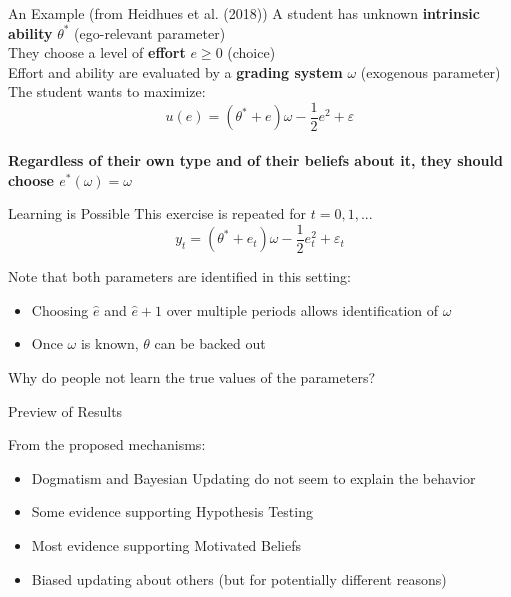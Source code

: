 \documentclass[aspectratio=169]{beamer}
\begin{document}
\begin{frame}{An Example (from Heidhues et al. (2018))}
    A student has unknown \textbf{intrinsic ability} $\theta^*$ (\alert{ego-relevant parameter})\\ 
    \bigskip
    They choose a level of \textbf{effort} $e\geq 0$ (\alert{choice}) \\
    \bigskip
    Effort and ability are evaluated by a \textbf{grading system} $\omega$ (\alert{exogenous parameter})\\
    \bigskip 
    The student wants to maximize:\\
        $$u(e) = (\theta^* + e)\omega-\frac{1}{2}e^2 +\varepsilon$$\\
    
    \bigskip
   \textbf{Regardless of their own type and of their beliefs about it, they should choose $e^*(\omega)=\omega$}\\

\end{frame}

\begin{frame}{Learning is Possible}
    This exercise is repeated for $t=0, 1, ...$
        $$y_t = (\theta^* + e_t)\omega-\frac{1}{2}e_t^2 +\varepsilon_t$$
    
    Note that both parameters are identified in this setting:\\
    \bigskip
    
    \begin{itemize}
        \item Choosing $\hat{e}$ and $\hat{e}+1$ over multiple periods allows identification of $\omega$\\
        \bigskip
        \item Once $\omega$ is known, $\theta$ can be backed out\\
     \end{itemize}
    \bigskip
    Why do people not learn the true values of the parameters?
\end{frame}

\begin{frame}{Preview of Results}

    From the proposed mechanisms:
    \begin{itemize}
        \item \alert{Dogmatism} and \alert{Bayesian Updating} do not seem to explain the behavior
        \bigskip
        \item Some evidence supporting \alert{Hypothesis Testing}
        \bigskip
        \item Most evidence supporting \alert{Motivated Beliefs}
        \bigskip
        \item Biased updating about others (but for potentially different reasons)
    \end{itemize}

\end{frame}
\end{document}

